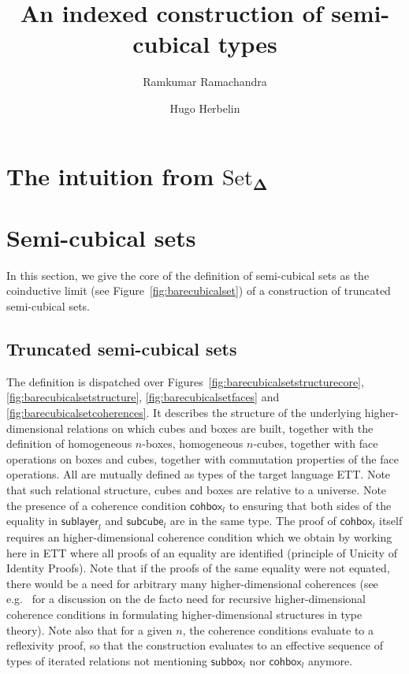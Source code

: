 \documentclass[a4paper]{article}
\title{An indexed construction of semi-cubical types}
\author{Ramkumar Ramachandra}
\author{Hugo Herbelin}
\newcommand{\homoname}{}
\newcommand{\downbox}[2]{\mathsf{sub{\homoname}box}_{#1}^{#2}}
\newcommand{\downlayer}[2]{\mathsf{sub{\homoname}layer}_{#1}^{#2}}
\newcommand{\downcube}[2]{\mathsf{sub{\homoname}cube}_{#1}^{#2}}
\newcommand{\cohbox}[2]{\mathsf{coh{\homoname}box}_{#1}^{#2}}
\newcommand{\SSet}{\ensuremath{\text{Set}_{\boldsymbol{\Delta}}}}
\begin{document}
\maketitle

\tableofcontents

\section{The intuition from \SSet}

\section{Semi-cubical sets}
\label{sec:truncated-cubical-sets}

In this section, we give the core of the definition of semi-cubical
sets as the coinductive limit (see Figure~\ref{fig:barecubicalset}) of a
construction of truncated semi-cubical sets.

\subsection{Truncated semi-cubical sets}

The definition is dispatched over Figures~\ref{fig:barecubicalsetstructurecore}, \ref{fig:barecubicalsetstructure}, \ref{fig:barecubicalsetfaces} and \ref{fig:barecubicalsetcoherences}. It describes the structure of the underlying higher-dimensional relations on which cubes and boxes are built, together with the definition of homogeneous $n$-boxes, homogeneous $n$-cubes, together with face operations on boxes and cubes, together with commutation properties of the face operations. All are mutually defined as types of the target language ETT. Note that such relational structure, cubes and boxes are relative to a universe. Note the presence of a coherence condition $\cohbox{l}{}$ to ensuring that both sides of the equality in $\downlayer{l}{}$ and $\downcube{l}{}$ are in the same type. The proof of $\cohbox{l}{}$ itself requires an higher-dimensional coherence condition which we obtain by working here in ETT where all proofs of an equality are identified (principle of Unicity of Identity Proofs). Note that if the proofs of the same equality were not equated, there would be a need for arbitrary many higher-dimensional coherences (see e.g.~\cite{Herbelin15} for a discussion on the de facto need for recursive higher-dimensional coherence conditions in formulating higher-dimensional structures in type theory). Note also that for a given $n$, the coherence conditions evaluate to a reflexivity proof, so that the construction evaluates to an effective sequence of types of iterated relations not mentioning $\downbox{l}{}$ nor $\cohbox{l}{}$ anymore.
\end{document}
